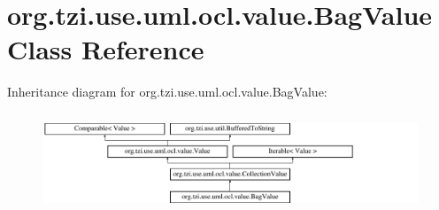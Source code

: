 \hypertarget{classorg_1_1tzi_1_1use_1_1uml_1_1ocl_1_1value_1_1_bag_value}{\section{org.\-tzi.\-use.\-uml.\-ocl.\-value.\-Bag\-Value Class Reference}
\label{classorg_1_1tzi_1_1use_1_1uml_1_1ocl_1_1value_1_1_bag_value}
}
Inheritance diagram for org.\-tzi.\-use.\-uml.\-ocl.\-value.\-Bag\-Value\-:\begin{figure}[H]
\begin{center}
\leavevmode
\includegraphics[height=2.974767cm]{classorg_1_1tzi_1_1use_1_1uml_1_1ocl_1_1value_1_1_bag_value}
\end{center}
\end{figure}
